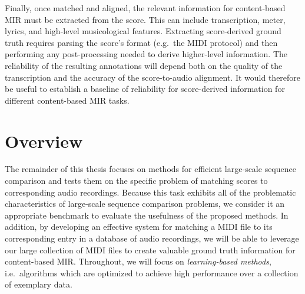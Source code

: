 Finally, once matched and aligned, the relevant information for content-based MIR must be extracted from the score.
This can include transcription, meter, lyrics, and high-level musicological features.
Extracting score-derived ground truth requires parsing the score's format (e.g.\ the MIDI protocol) and then performing any post-processing needed to derive higher-level information.
The reliability of the resulting annotations will depend both on the quality of the transcription and the accuracy of the score-to-audio alignment.
It would therefore be useful to establish a baseline of reliability for score-derived information for different content-based MIR tasks.

\section{Overview}

The remainder of this thesis focuses on methods for efficient large-scale sequence comparison and tests them on the specific problem of matching scores to corresponding audio recordings.
Because this task exhibits all of the problematic characteristics of large-scale sequence comparison problems, we consider it an appropriate benchmark to evaluate the usefulness of the proposed methods.
In addition, by developing an effective system for matching a MIDI file to its corresponding entry in a database of audio recordings, we will be able to leverage our large collection of MIDI files to create valuable ground truth information for content-based MIR.
Throughout, we will focus on {\em learning-based methods}, i.e.\ algorithms which are optimized to achieve high performance over a collection of exemplary data.

